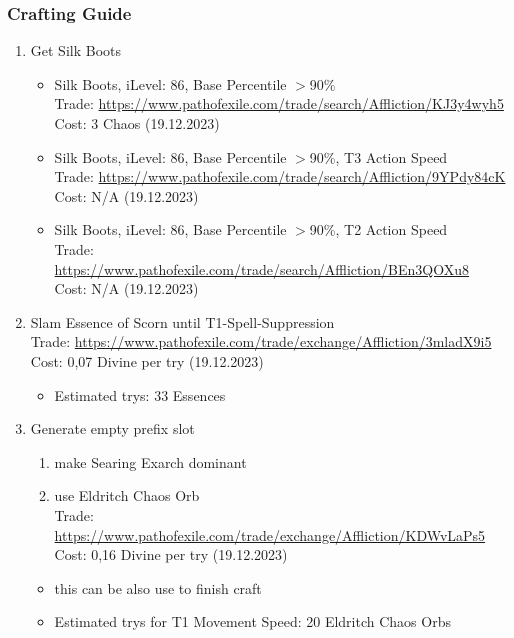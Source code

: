 \subsubsection{Crafting Guide}
\begin{enumerate}
	\item Get Silk Boots
	\begin{itemize}
		\item Silk Boots, iLevel: 86, Base Percentile $>$90\%\\
			Trade: \url{https://www.pathofexile.com/trade/search/Affliction/KJ3y4wyh5}\\
			Cost: 3 Chaos (19.12.2023)
		\item Silk Boots, iLevel: 86, Base Percentile $>$90\%, T3 Action Speed\\
			Trade: \url{https://www.pathofexile.com/trade/search/Affliction/9YPdy84cK}\\
			Cost: N/A (19.12.2023)
		\item Silk Boots, iLevel: 86, Base Percentile $>$90\%, T2 Action Speed\\
			Trade: \url{https://www.pathofexile.com/trade/search/Affliction/BEn3QOXu8}\\
			Cost: N/A (19.12.2023)
	\end{itemize}
	\item Slam Essence of Scorn until T1-Spell-Suppression\\
		Trade: \url{https://www.pathofexile.com/trade/exchange/Affliction/3mladX9i5}\\
		Cost: 0,07 Divine per try (19.12.2023)
	\begin{itemize}
		\item Estimated trys: 33 Essences
	\end{itemize}
	\item Generate empty prefix slot
	\begin{enumerate}
		\item make Searing Exarch dominant
		\item use Eldritch Chaos Orb\\
			Trade: \url{https://www.pathofexile.com/trade/exchange/Affliction/KDWvLaPs5}\\
			Cost: 0,16 Divine per try (19.12.2023)
	\end{enumerate}
	\begin{itemize}
		\item this can be also use to finish craft
		\item Estimated trys for T1 Movement Speed: 20 Eldritch Chaos Orbs
	\end{itemize}

\end{enumerate}
